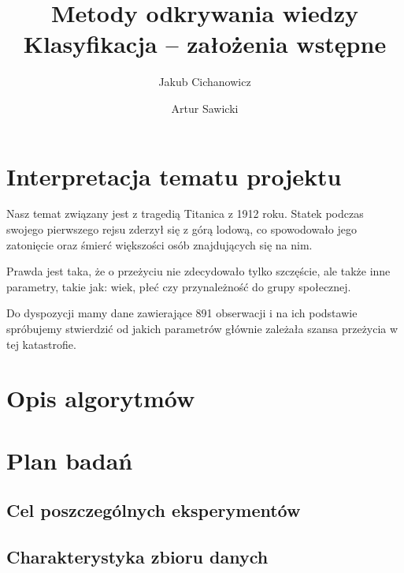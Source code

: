 \documentclass{article}
\begin{document}
\title{Metody odkrywania wiedzy \\%
{\large Klasyfikacja -- założenia wstępne} }

\author{Jakub Cichanowicz \and Artur Sawicki}

\maketitle

\section{Interpretacja tematu projektu}
Nasz temat związany jest z tragedią Titanica z 1912 roku. Statek podczas swojego pierwszego rejsu zderzył się z górą lodową, co spowodowało jego zatonięcie oraz śmierć większości osób znajdujących się na nim.

Prawda jest taka, że o przeżyciu nie zdecydowało tylko szczęście, ale także inne parametry, takie jak: wiek, płeć czy przynależność do grupy społecznej.

Do dyspozycji mamy dane zawierające 891 obserwacji i na ich podstawie spróbujemy stwierdzić od jakich parametrów głównie zależała szansa przeżycia w tej katastrofie.

\section{Opis algorytmów}

\section{Plan badań}

\subsection{Cel poszczególnych eksperymentów}
\subsection{Charakterystyka zbioru danych}
\end{document}
